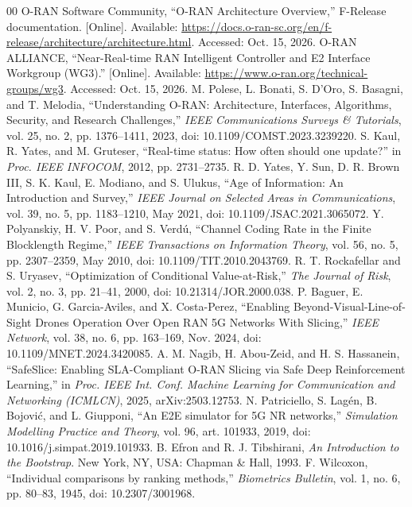 \documentclass[conference]{IEEEtran}
\begin{document}
\begin{thebibliography}{00}
 O-RAN Software Community, ``O-RAN Architecture Overview,'' F-Release documentation. [Online]. Available: \url{https://docs.o-ran-sc.org/en/f-release/architecture/architecture.html}. Accessed: Oct. 15, 2026.
 O-RAN ALLIANCE, ``Near-Real-time RAN Intelligent Controller and E2 Interface Workgroup (WG3).'' [Online]. Available: \url{https://www.o-ran.org/technical-groups/wg3}. Accessed: Oct. 15, 2026.
 M. Polese, L. Bonati, S. D'Oro, S. Basagni, and T. Melodia, ``Understanding O-RAN: Architecture, Interfaces, Algorithms, Security, and Research Challenges,'' \emph{IEEE Communications Surveys \& Tutorials}, vol. 25, no. 2, pp. 1376--1411, 2023, doi: 10.1109/COMST.2023.3239220.
 S. Kaul, R. Yates, and M. Gruteser, ``Real-time status: How often should one update?'' in \emph{Proc. IEEE INFOCOM}, 2012, pp. 2731--2735.
 R. D. Yates, Y. Sun, D. R. Brown III, S. K. Kaul, E. Modiano, and S. Ulukus, ``Age of Information: An Introduction and Survey,'' \emph{IEEE Journal on Selected Areas in Communications}, vol. 39, no. 5, pp. 1183--1210, May 2021, doi: 10.1109/JSAC.2021.3065072.
 Y. Polyanskiy, H. V. Poor, and S. Verd\'u, ``Channel Coding Rate in the Finite Blocklength Regime,'' \emph{IEEE Transactions on Information Theory}, vol. 56, no. 5, pp. 2307--2359, May 2010, doi: 10.1109/TIT.2010.2043769.
 R. T. Rockafellar and S. Uryasev, ``Optimization of Conditional Value-at-Risk,'' \emph{The Journal of Risk}, vol. 2, no. 3, pp. 21--41, 2000, doi: 10.21314/JOR.2000.038.
 P. Baguer, E. Municio, G. Garcia-Aviles, and X. Costa-Perez, ``Enabling Beyond-Visual-Line-of-Sight Drones Operation Over Open RAN 5G Networks With Slicing,'' \emph{IEEE Network}, vol. 38, no. 6, pp. 163--169, Nov. 2024, doi: 10.1109/MNET.2024.3420085.
 A. M. Nagib, H. Abou-Zeid, and H. S. Hassanein, ``SafeSlice: Enabling SLA-Compliant O-RAN Slicing via Safe Deep Reinforcement Learning,'' in \emph{Proc. IEEE Int. Conf. Machine Learning for Communication and Networking (ICMLCN)}, 2025, arXiv:2503.12753.
 N. Patriciello, S. Lag\'en, B. Bojovi\'c, and L. Giupponi, ``An E2E simulator for 5G NR networks,'' \emph{Simulation Modelling Practice and Theory}, vol. 96, art. 101933, 2019, doi: 10.1016/j.simpat.2019.101933.
 B. Efron and R. J. Tibshirani, \emph{An Introduction to the Bootstrap}. New York, NY, USA: Chapman \& Hall, 1993.
 F. Wilcoxon, ``Individual comparisons by ranking methods,'' \emph{Biometrics Bulletin}, vol. 1, no. 6, pp. 80--83, 1945, doi: 10.2307/3001968.
\end{thebibliography}
\end{document}
